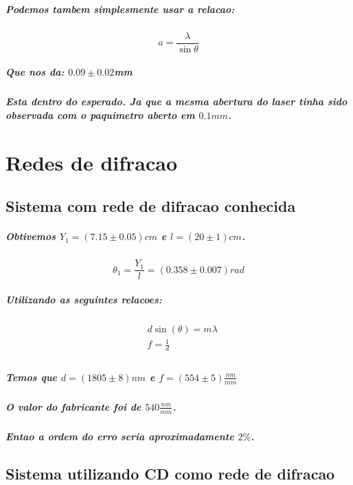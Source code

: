 \documentclass[12pt,twoside, a4paper, twocolumn]{article}
\begin{document}
\subparagraph*{Podemos tambem simplesmente usar a relacao:}

\begin{equation}
  a = \frac{\lambda}{\sin{\theta}}
\end{equation}

\subparagraph*{Que nos da: $0.09 \pm 0.02$mm}

\subparagraph*{Esta dentro do esperado. Ja que a mesma abertura do laser tinha sido observada com o paquimetro aberto em $0.1mm$.}

\newpage

\pagebreak

\section{Redes de difracao}

\subsection{Sistema com rede de difracao conhecida}

\subparagraph*{Obtivemos $Y_1 = (7.15 \pm 0.05)cm$ e $l = (20 \pm 1)cm$.}

\begin{equation}
  \theta_1 = \frac{Y_1}{l} = (0.358 \pm 0.007)rad
\end{equation}



\subparagraph*{Utilizando as seguintes relacoes:}

\begin{equation}
  \begin{aligned}
     & d \sin(\theta) = m \lambda \\
     & f = \frac{1}{d}            \\
  \end{aligned}
\end{equation}

\subparagraph*{Temos que $d = (1805 \pm 8) nm$ e $f = (554 \pm 5) \frac{nm}{mm}$ }

\subparagraph*{O valor do fabricante foi de  $540 \frac{nm}{mm}$.}

\subparagraph*{Entao a ordem do erro seria aproximadamente $2\%$.}

\subsection{Sistema utilizando CD como rede de difracao}
\end{document}
